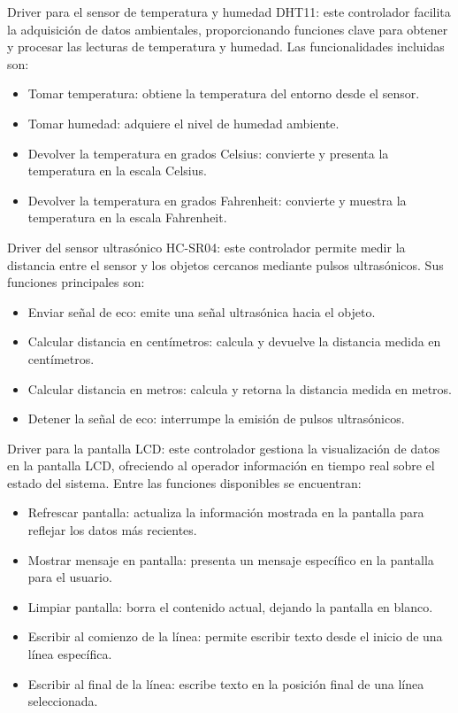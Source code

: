 Driver para el sensor de temperatura y humedad DHT11: este controlador facilita la adquisición de datos ambientales, proporcionando funciones clave para obtener y procesar las lecturas de temperatura y humedad. Las funcionalidades incluidas son:
\begin{itemize}
\item Tomar temperatura: obtiene la temperatura del entorno desde el sensor.
\item Tomar humedad: adquiere el nivel de humedad ambiente.
\item Devolver la temperatura en grados Celsius: convierte y presenta la temperatura en la escala Celsius.
\item Devolver la temperatura en grados Fahrenheit: convierte y muestra la temperatura en la escala Fahrenheit.
\end{itemize}

\newpage

Driver del sensor ultrasónico HC-SR04: este controlador permite medir la distancia entre el sensor y los objetos cercanos mediante pulsos ultrasónicos. Sus funciones principales son:
\begin{itemize}
\item Enviar señal de eco: emite una señal ultrasónica hacia el objeto.
\item Calcular distancia en centímetros: calcula y devuelve la distancia medida en centímetros.
\item Calcular distancia en metros: calcula y retorna la distancia medida en metros.
\item Detener la señal de eco: interrumpe la emisión de pulsos ultrasónicos.
\end{itemize}

Driver para la pantalla LCD: este controlador gestiona la visualización de datos en la pantalla LCD, ofreciendo al operador información en tiempo real sobre el estado del sistema. Entre las funciones disponibles se encuentran:
\begin{itemize}
\item Refrescar pantalla: actualiza la información mostrada en la pantalla para reflejar los datos más recientes.
\item Mostrar mensaje en pantalla: presenta un mensaje específico en la pantalla para el usuario.
\item Limpiar pantalla: borra el contenido actual, dejando la pantalla en blanco.
\item Escribir al comienzo de la línea: permite escribir texto desde el inicio de una línea específica.
\item Escribir al final de la línea: escribe texto en la posición final de una línea seleccionada.
\end{itemize}

